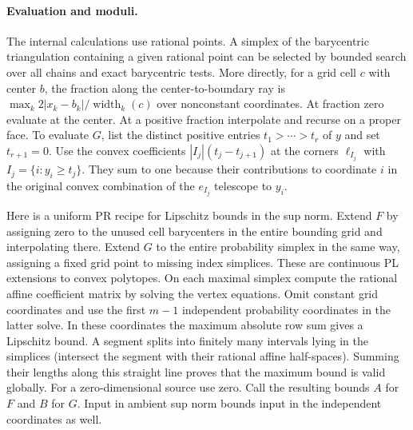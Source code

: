 \paragraph{Evaluation and moduli.}
The internal calculations use rational points. A simplex of the barycentric
triangulation containing a given rational point can be selected by bounded
search over all chains and exact barycentric tests. More directly, for a grid
cell $c$ with center $b$, the fraction along the center-to-boundary ray is
$\max_k 2|x_k-b_k|/\operatorname{width}_k(c)$ over nonconstant coordinates.
At fraction zero evaluate at the center. At a positive fraction interpolate and recurse
on a proper face. To evaluate $G$, list the distinct positive entries
$t_1>\cdots>t_r$ of $y$ and set $t_{r+1}=0$. Use the convex coefficients
$|I_j|(t_j-t_{j+1})$ at the corners $\ell_{I_j}$ with
$I_j=\{i:y_i\ge t_j\}$. They sum to one because their contributions to
coordinate $i$ in the original convex combination of the $e_{I_j}$
telescope to $y_i$.

Here is a uniform PR recipe for Lipschitz bounds in the sup norm. Extend
$F$ by assigning zero to the unused cell barycenters in the entire
bounding grid and interpolating there. Extend $G$ to the entire probability
simplex in the same way, assigning a fixed grid point to missing index
simplices. These are continuous PL extensions to convex polytopes. On each
maximal simplex compute the rational affine coefficient matrix by solving
the vertex equations. Omit constant grid coordinates and use the first
$m-1$ independent probability coordinates in the latter solve. In these
coordinates the maximum absolute row sum gives a Lipschitz bound.
A segment splits into finitely many intervals lying in the simplices
(intersect the segment with their rational affine half-spaces). Summing
their lengths along this straight line proves that the maximum bound is
valid globally. For a zero-dimensional source use zero.
Call the resulting bounds $A$ for $F$ and $B$ for $G$. Input in ambient
sup norm bounds input in the independent coordinates as well.

